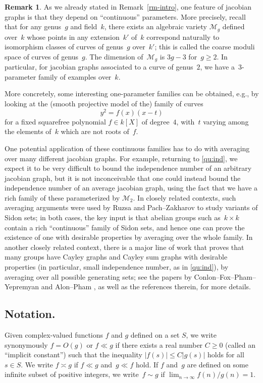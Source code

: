 \documentclass[12pt]{amsart}
\renewcommand{\leq}{\leqslant}
\renewcommand{\geq}{\geqslant}
\numberwithin{equation}{section}
\renewcommand{\mathcal}{\mathscr}
\theoremstyle{plain}
\theoremstyle{remark}
\theoremstyle{definition}
\newtheorem{remark}[theorem]{Remark}
\renewcommand{\geq}{\geqslant}
\renewcommand{\leq}{\leqslant}
\begin{document}
\begin{remark}\label{rm-moduli}
  As we already stated in Remark~\ref{rm-intro}, one feature of jacobian
  graphs is that they depend on ``continuous'' parameters. More
  precisely, recall that for any genus~$g$ and field~$k$, there exists an
  algebraic variety $\mathcal{M}_g$ defined over~$k$ whose points in any
  extension~$k'$ of~$k$ correspond naturally to isomorphism classes of
  curves of genus~$g$ over~$k'$; this is called the {coarse
    moduli space} of curves of genus~$g$. The dimension
  of~$\mathcal{M}_g$ is $3g-3$ for~\hbox{$g\geq 2$}. In particular, for
  jacobian graphs associated to a curve of genus~$2$, we have
  a~$3$\nobreakdash-parameter family of examples over~$k$.

  More concretely, some interesting one-parameter families can be
  obtained, e.g., by looking at the (smooth projective model of the)
  family of curves
  \[
    y^2=f(x)(x-t)
  \]
  for a fixed squarefree polynomial $f\in k[X]$ of degree~$4$, with~$t$
  varying among the elements of~$k$ which are not roots of~$f$.

  One potential application of these continuous families has to do with averaging over many different jacobian graphs. For example, returning to \cref{qu:ind}, we expect it to be very difficult to bound the independence number of an arbitrary jacobian graph, but it is not inconceivable that one could instead bound the independence number of an average jacobian graph, using the fact that we have a rich family of these parameterized by $\mathcal M_2$. In closely related contexts, such averaging arguments were used by Ruzsa \cite{ruzsa} and Pach--Zakharov \cite{pz} to study variants of Sidon sets; in both cases, the key input is that abelian groups such as~$k \times k$ contain a rich ``continuous'' family of Sidon sets, and hence one can prove the existence of one with desirable properties by averaging over the whole family. In another closely related context, there is a major line of work that proves that many groups have Cayley graphs and Cayley sum graphs with desirable properties (in particular, small independence number, as in \cref{qu:ind}), by averaging over all possible generating sets; see the papers by Conlon\nobreakdash--Fox\nobreakdash--Pham--Yepremyan \cite{cfpy} and Alon--Pham \cite{ap}, as well as the references therein, for more details. 
\end{remark}

\subsection*{Notation.} Given complex-valued functions $f$ and $g$
defined on a set $S$, we write synonymously $f=O(g)$ or $f \ll g$ if
there exists a real number $C \geq 0$ (called an ``implicit
constant'') such that the inequality $|f(s)|\leq C |g(s)|$ holds for all
$s \in S$. We write $f\asymp g$ if $f\ll g$ and~$g\ll f$ hold. If $f$ and~$g$ are defined on some infinite subset of positive integers,
we write~$f \sim g$ if $\lim_{n \to \infty} f(n)/g(n)=1$.
\end{document}
